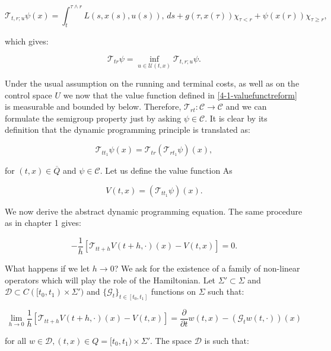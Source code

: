 \begin{equation}\label{4-1-valuefunctreform}
    \mathcal{T}_{t,r;u}\psi(x) = \int_t^{\tau\wedge r}L(s,x(s),u(s)),\,ds + g(\tau,x(\tau))\chi_{\tau<r} + \psi(x(r))\chi_{\tau\geq r}, 
\end{equation}

which gives:

\begin{equation}\label{4-1-defofT_dynam}
    \mathcal{T}_{tr}\psi = \inf_{u\in\mathcal{U}(t,x)} \mathcal{T}_{t,r;u}\psi.
\end{equation}

Under the usual assumption on the running and terminal costs, as well as on the control space $U$ we now that the value function defined in \ref{4-1-valuefunctreform} 
is measurable and bounded by below. Therefore, $\mathcal{T}_{rt}:\mathcal{C}\rightarrow\mathcal{C}$ and we can formulate the semigroup property just by asking $\psi\in\mathcal{C}$. 
It is clear by its definition that the dynamic programming principle is translated as:

\[\mathcal{T}_{tt_1}\psi(x)=\mathcal{T}_{tr}\left(\mathcal{T}_{rt_1}\psi\right)(x),\]

for $(t,x)\in\overline{Q}$ and $\psi\in\mathcal{C}$. Let us define the value function As

\begin{equation}
    V(t,x) = (\mathcal{T}_{tt_1}\psi)(x).
\end{equation}

We now derive the abstract dynamic programming equation. The same procedure as in chapter 1 gives:

\[-\frac{1}{h}\left[\mathcal{T}_{tt+h}V(t+h,\cdot)(x)-V(t,x)\right]=0.\]

What happens if we let $h\to0$? We ask for the existence of a family of non-linear operators which will play the role of the Hamiltonian. 
Let $\Sigma'\subset\Sigma$ and $\mathcal{D}\subset C([t_0,t_1)\times\Sigma')$ and $\{\mathcal{G}_t\}_{t\in[t_0,t_1]}$ functions on $\Sigma$ such that:

\begin{equation}\label{4-1-conditiononG_t}
    \lim_{h\to 0}\frac{1}{h}\left[\mathcal{T}_{tt+h}V(t+h,\cdot)(x)-V(t,x)\right] = \frac{\partial}{\partial t}w(t,x) - (\mathcal{G}_tw(t,\cdot))(x)
\end{equation}

for all $w\in\mathcal{D},(t,x)\in Q=[t_0,t_1)\times\Sigma'$. The space $\mathcal{D}$ is such that:

